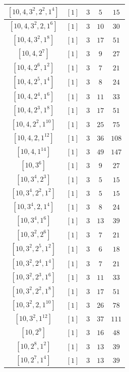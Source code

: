 \documentclass{article}%
\begin{document}
\begin{center}
\begin{longtable}{||c|c|c|c|c||}
$[10, 4, 3^{2}, 2^{2}, 1^{4}]$ & $[1]$ & $3$ & $5$ & $15$ \\ \hline 
$[10, 4, 3^{2}, 2, 1^{6}]$ & $[1]$ & $3$ & $10$ & $30$ \\ \hline 
$[10, 4, 3^{2}, 1^{8}]$ & $[1]$ & $3$ & $17$ & $51$ \\ \hline 
$[10, 4, 2^{7}]$ & $[1]$ & $3$ & $9$ & $27$ \\ \hline 
$[10, 4, 2^{6}, 1^{2}]$ & $[1]$ & $3$ & $7$ & $21$ \\ \hline 
$[10, 4, 2^{5}, 1^{4}]$ & $[1]$ & $3$ & $8$ & $24$ \\ \hline 
$[10, 4, 2^{4}, 1^{6}]$ & $[1]$ & $3$ & $11$ & $33$ \\ \hline 
$[10, 4, 2^{3}, 1^{8}]$ & $[1]$ & $3$ & $17$ & $51$ \\ \hline 
$[10, 4, 2^{2}, 1^{10}]$ & $[1]$ & $3$ & $25$ & $75$ \\ \hline 
$[10, 4, 2, 1^{12}]$ & $[1]$ & $3$ & $36$ & $108$ \\ \hline 
$[10, 4, 1^{14}]$ & $[1]$ & $3$ & $49$ & $147$ \\ \hline 
$[10, 3^{6}]$ & $[1]$ & $3$ & $9$ & $27$ \\ \hline 
$[10, 3^{4}, 2^{3}]$ & $[1]$ & $3$ & $5$ & $15$ \\ \hline 
$[10, 3^{4}, 2^{2}, 1^{2}]$ & $[1]$ & $3$ & $5$ & $15$ \\ \hline 
$[10, 3^{4}, 2, 1^{4}]$ & $[1]$ & $3$ & $8$ & $24$ \\ \hline 
$[10, 3^{4}, 1^{6}]$ & $[1]$ & $3$ & $13$ & $39$ \\ \hline 
$[10, 3^{2}, 2^{6}]$ & $[1]$ & $3$ & $7$ & $21$ \\ \hline 
$[10, 3^{2}, 2^{5}, 1^{2}]$ & $[1]$ & $3$ & $6$ & $18$ \\ \hline 
$[10, 3^{2}, 2^{4}, 1^{4}]$ & $[1]$ & $3$ & $7$ & $21$ \\ \hline 
$[10, 3^{2}, 2^{3}, 1^{6}]$ & $[1]$ & $3$ & $11$ & $33$ \\ \hline 
$[10, 3^{2}, 2^{2}, 1^{8}]$ & $[1]$ & $3$ & $17$ & $51$ \\ \hline 
$[10, 3^{2}, 2, 1^{10}]$ & $[1]$ & $3$ & $26$ & $78$ \\ \hline 
$[10, 3^{2}, 1^{12}]$ & $[1]$ & $3$ & $37$ & $111$ \\ \hline 
$[10, 2^{9}]$ & $[1]$ & $3$ & $16$ & $48$ \\ \hline 
$[10, 2^{8}, 1^{2}]$ & $[1]$ & $3$ & $13$ & $39$ \\ \hline 
$[10, 2^{7}, 1^{4}]$ & $[1]$ & $3$ & $13$ & $39$ \\ \hline 

\end{longtable}
\end{center}
\end{document}

